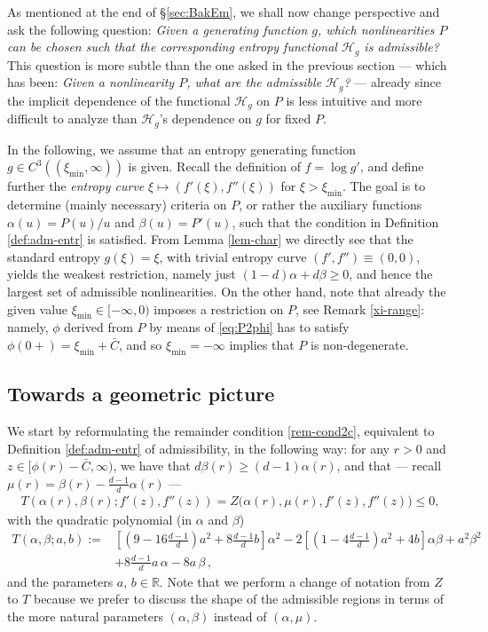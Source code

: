 \documentclass[reqno]{amsart}
\newcommand{\R}{\mathbb{R}}
\newcommand{\ximin}{\xi_{\text{min}}}
\begin{document}
As mentioned at the end of \S\ref{sec:BakEm}, we shall now change perspective and ask the following question: \emph{Given a generating function $g$, which nonlinearities $P$ can be chosen such that the corresponding entropy functional $\mathcal H_g$ is admissible?} This question is more subtle than the one asked in the previous section --- which has been: \emph{Given a nonlinearity $P$, what are the admissible $\mathcal H_g$?} --- already since the implicit dependence of the functional $\mathcal H_g$ on $P$ is less intuitive and more difficult to analyze than $\mathcal H_g$'s dependence on $g$ for fixed $P$.

In the following, we assume that an entropy generating function  $g\in C^3((\ximin,\infty))$ is given. Recall the definition of $f=\log g'$, and define further the \emph{entropy curve} $\xi\mapsto(f'(\xi),f''(\xi))$ for $\xi>\ximin$. The goal is to determine (mainly necessary) criteria on $P$, or rather the auxiliary functions $\alpha(u)=P(u)/u$ and $\beta(u)=P'(u)$, such that the condition in Definition \ref{def:adm-entr} is satisfied. From Lemma \ref{lem-char} we directly see that the standard entropy $g(\xi)=\xi$, with trivial entropy curve $(f',f'')\equiv(0,0)$, yields the weakest restriction, namely just $(1-d)\alpha +d\beta\ge0$, and hence the largest set of admissible nonlinearities. On the other hand, note that already the given value $\ximin\in[-\infty,0)$ imposes a restriction on $P$, see Remark \ref{xi-range}: namely, $\phi$ derived from $P$ by means of \eqref{eq:P2phi} has to satisfy $\phi(0+)=\ximin+\bar C$, and so $\ximin=-\infty$ implies that $P$ is non-degenerate.

\subsection{Towards a geometric picture}\label{sec:geompic} 
We start by reformulating the remainder condition \eqref{rem-cond2c}, equivalent to Definition \ref{def:adm-entr} of admissibility, in the following way: for any $r>0$ and $z\in [\phi(r)-\bar C,\infty)$, we have that $d\beta(r)\ge(d-1)\alpha(r)$, and that --- recall $\mu(r)=\beta(r)-\frac{d-1}{d}\alpha(r)$ ---
\begin{align*}
    T(\alpha(r),\beta(r);f'(z),f''(z))=Z\big(\alpha(r),\mu(r),f'(z),f''(z)\big)\le0,
\end{align*}
with the quadratic polynomial (in $\alpha$ and $\beta$)
\begin{align}\label{quadric-cond}
  T(\alpha,\beta;a,b):=& \nonumber
  \left[\left(9-16\frac{d-1}{d}\right)a^2+8\frac{d-1}{d}b\right]\alpha^2-2\left[\left(1-4\frac{d-1}{d}\right)a^2+4b\right]\alpha\beta +a^2\beta^2 \\
  &+8\frac{d-1}{d}a\,\alpha - 8a\,\beta\,,
\end{align}
and the parameters $a,\,b\in\R$.
Note that we perform a change of notation from $Z$ to $T$ because we prefer to discuss the shape of the admissible regions in terms of the more natural parameters $(\alpha,\beta)$ instead of $(\alpha,\mu)$.
\end{document}
